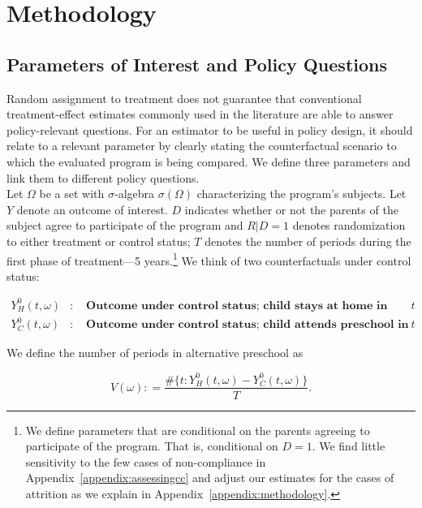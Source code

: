 \section{Methodology} \label{section:methodology}

\subsection{Parameters of Interest and Policy Questions} \label{section:methodsquestions}

\noindent Random assignment to treatment does not guarantee that conventional treatment-effect estimates commonly used in the literature are able to answer policy-relevant questions. For an estimator to be useful in policy design, it should relate to a relevant parameter by clearly stating the counterfactual scenario to which the evaluated program is being compared. We define three parameters and link them to different policy questions.\\ 

\noindent Let $\Omega$ be a set with $\sigma$-algebra $\sigma \left( \Omega \right)$ characterizing the program's subjects. Let $Y$ denote an outcome of interest. $D$ indicates whether or not the parents of the subject agree to participate of the program and $R | D = 1$ denotes randomization to either treatment or control status; $T$ denotes the number of periods during the first phase of treatment---5 years.\footnote{We define parameters that are conditional on the parents agreeing to participate of the program. That is, conditional on $D = 1$. We find little sensitivity to the few cases of non-compliance in Appendix~\ref{appendix:assessingcc} and adjust our estimates for the cases of attrition as we explain in Appendix~\ref{appendix:methodology}.} We think of two counterfactuals under control status: 

\begin{eqnarray}
Y_H^0 \left( t, \omega \right) &:& \textbf{ Outcome under control status; child stays at home in period $t$} \nonumber \\ 
Y_C^0 \left( t, \omega \right) &:& \textbf{ Outcome under control status; child attends preschool in period $t$}  \nonumber
\end{eqnarray}

\noindent We define the number of periods in alternative preschool as 

\begin{equation}
V \left ( \omega \right) : = \frac{\# \{ t: Y_H^0 \left( t, \omega \right) - Y_C^0 \left( t, \omega \right)  \} }{T}.
\end{equation}

